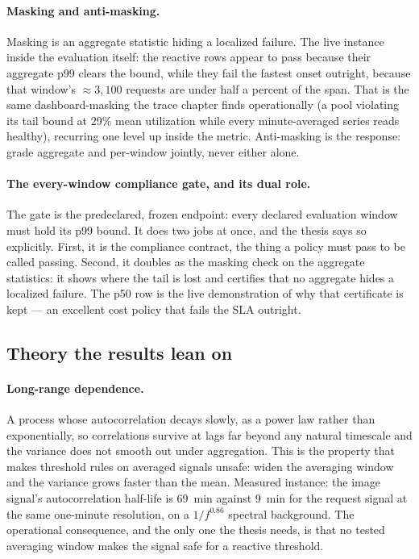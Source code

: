 \documentclass[11pt,a4paper]{article}
\def\emph#1{#1}\def\texttt#1{#1}%
\begin{document}
\paragraph{Masking and anti-masking.} Masking is an aggregate statistic
hiding a localized failure. The live instance inside the evaluation itself:
the reactive rows \emph{appear} to pass because their aggregate p99 clears
the bound, while they fail the fastest onset outright, because that window's
${\approx}3{,}100$ requests are under half a percent of the span. That is the
same dashboard-masking the trace chapter finds operationally (a pool
violating its tail bound at 29\% mean utilization while every
minute-averaged series reads healthy), recurring one level up inside the
metric. Anti-masking is the response: grade aggregate \emph{and} per-window
jointly, never either alone.

\paragraph{The every-window compliance gate, and its dual role.} The gate is
the predeclared, frozen endpoint: every declared evaluation window must hold
its p99 bound. It does two jobs at once, and the thesis says so explicitly.
First, it is the \emph{compliance} contract, the thing a policy must pass to
be called passing. Second, it \emph{doubles as the masking check} on the
aggregate statistics: it shows where the tail is lost and certifies that no
aggregate hides a localized failure. The p50 row is the live demonstration of
why that certificate is kept --- an excellent cost policy that fails the SLA
outright.

\subsection*{Theory the results lean on}

\paragraph{Long-range dependence.} A process whose autocorrelation decays
slowly, as a power law rather than exponentially, so correlations survive at
lags far beyond any natural timescale and the variance does not smooth out
under aggregation. This is the property that makes threshold rules on
averaged signals unsafe: widen the averaging window and the variance grows
faster than the mean. Measured instance: the image signal's autocorrelation
half-life is \SI{69}{\minute} against \SI{9}{\minute} for the request signal
at the same one-minute resolution, on a $1/f^{0.86}$ spectral background. The
operational consequence, and the only one the thesis needs, is that no tested
averaging window makes the signal safe for a reactive threshold.
\end{document}
